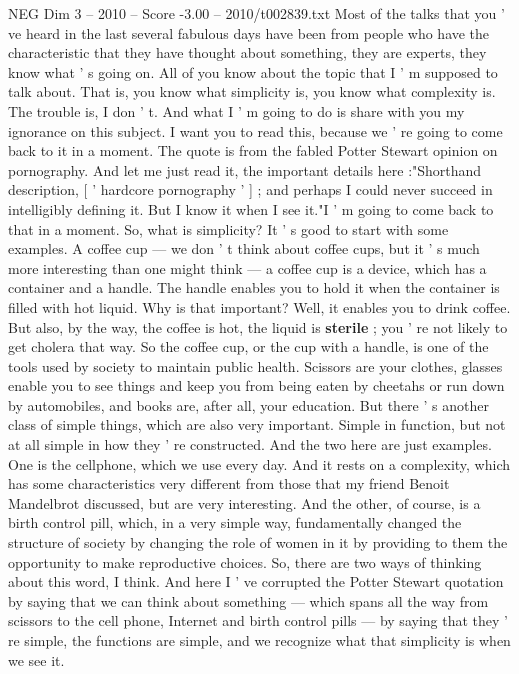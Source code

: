 \begin{textsample}{NEG Dim 3 – 2010 – Score -3.00 – 2010/t002839.txt}  \label{ex:f3_neg_025}
Most of the talks that you ' ve heard in the last several fabulous days have been from people who have the characteristic that they have thought about something, they are experts, they know what ' s going on.
All of you know about the topic that I ' m supposed to talk about.
That is, you know what simplicity is, you know what complexity is.
The trouble is, I don ' t.
And what I ' m going to do is share with you my ignorance on this subject.
I want you to read this, because we ' re going to come back to it in a moment.
The quote is from the fabled Potter Stewart opinion on pornography.
And let me just read it, the important details here :"Shorthand description, [ ' hardcore pornography ' ] ; and perhaps I could never succeed in intelligibly defining it.
But I know it when I see it."I ' m going to come back to that in a moment.
So, what is simplicity?
It ' s good to start with some examples.
A coffee cup — we don ' t think about coffee cups, but it ' s much more interesting than one might think — a coffee cup is a device, which has a container and a handle.
The handle enables you to hold it when the container is filled with hot liquid.
Why is that important?
Well, it enables you to drink coffee.
But also, by the way, the coffee is hot, the liquid is \textbf{sterile} ; you ' re not likely to get cholera that way.
So the coffee cup, or the cup with a handle, is one of the tools used by society to maintain public health.
Scissors are your clothes, glasses enable you to see things and keep you from being eaten by cheetahs or run down by automobiles, and books are, after all, your education.
But there ' s another class of simple things, which are also very important.
Simple in function, but not at all simple in how they ' re constructed.
And the two here are just examples.
One is the cellphone, which we use every day.
And it rests on a complexity, which has some characteristics very different from those that my friend Benoit Mandelbrot discussed, but are very interesting.
And the other, of course, is a birth control pill, which, in a very simple way, fundamentally changed the structure of society by changing the role of women in it by providing to them the opportunity to make reproductive choices.
So, there are two ways of thinking about this word, I think.
And here I ' ve corrupted the Potter Stewart quotation by saying that we can think about something — which spans all the way from scissors to the cell phone, Internet and birth control pills — by saying that they ' re simple, the functions are simple, and we recognize what that simplicity is when we see it.

\end{textsample}
